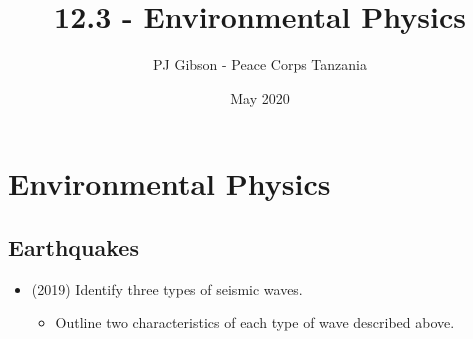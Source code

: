 \documentclass{article}
\title{12.3 - Environmental Physics}
\author{PJ Gibson - Peace Corps Tanzania}
\date{May 2020}
\begin{document}
\maketitle


\section{Environmental Physics}

\subsection{Earthquakes}
\begin{itemize}
\item (2019)  Identify three types of seismic waves.
 \begin{itemize}
\item Outline two characteristics of each type of wave described above.
\end{itemize}
\end{itemize}
\end{document}
